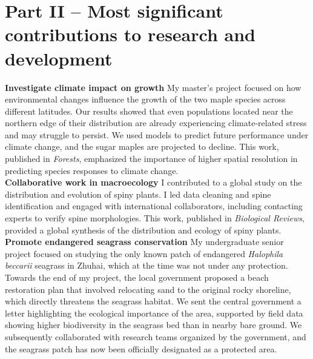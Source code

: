 \documentclass[12pt]{article}
\begin{document}
\section*{Part II – Most significant contributions to research and development}
\textbf{Investigate climate impact on growth} My master’s project focused on how environmental changes influence the growth of the two maple species across different latitudes. Our results showed that even populations located near the northern edge of their distribution are already experiencing climate-related stress and may struggle to persist. We used models to predict future performance under climate change, and the sugar maples are projected to decline. This work, published in \textit{Forests}, emphasized the importance of higher spatial resolution in predicting species responses to climate change.\\
\textbf{Collaborative work in macroecology} I contributed to a global study on the distribution and evolution of spiny plants. I led data cleaning and spine identification and engaged with international collaborators, including contacting experts to verify spine morphologies. This work, published in \textit{Biological Reviews}, provided a global synthesis of the distribution and ecology of spiny plants. \\
\textbf{Promote endangered seagrass conservation} My undergraduate senior project focused on studying the only known patch of endangered \textit{Halophila beccarii} seagrass in Zhuhai, which at the time was not under any protection. Towards the end of my project, the local government proposed a beach restoration plan that involved relocating sand to the original rocky shoreline, which directly threatens the seagrass habitat. We sent the central government a letter highlighting the ecological importance of the area, supported by field data showing higher biodiversity in the seagrass bed than in nearby bare ground. We subsequently collaborated with research teams organized by the government, and the seagrass patch has now been officially designated as a protected area.\\
\end{document}
